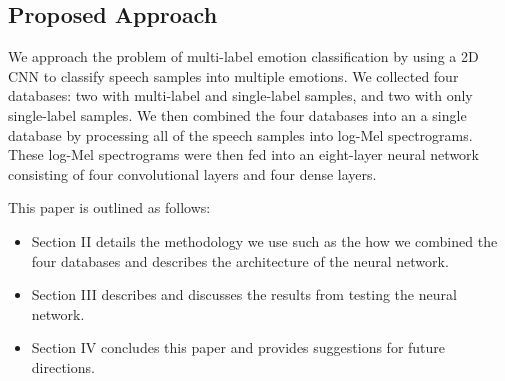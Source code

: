 \documentclass[conference]{IEEEtran}
\begin{document}
\subsection{Proposed Approach}

We approach the problem of multi-label emotion classification by using a 2D CNN to classify speech samples into multiple emotions. We collected four databases: two with multi-label and single-label samples, and two with only single-label samples. We then combined the four databases into an a single database by processing all of the speech samples into log-Mel spectrograms. These log-Mel spectrograms were then fed into an eight-layer neural network consisting of four convolutional layers and four dense layers.

This paper is outlined as follows:
\begin{itemize}
	\item Section II details the methodology we use such as the how we combined the four databases and describes the architecture of the neural network.
	\item Section III describes and discusses the results from testing the neural network.
	\item Section IV concludes this paper and provides suggestions for future directions.
\end{itemize}
\end{document}
